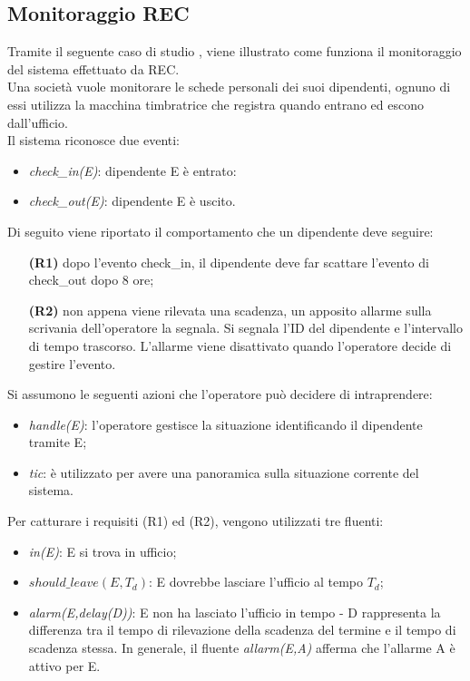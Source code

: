 \documentclass[a4paper,12pt]{report}
\begin{document}
\subsection{Monitoraggio REC}
Tramite il seguente caso di studio \cite{rif4}, viene illustrato come funziona il monitoraggio del sistema effettuato da REC.\\
Una società vuole monitorare le schede personali dei suoi dipendenti, ognuno di essi utilizza la macchina timbratrice che registra quando entrano ed escono dall'ufficio.\\
Il sistema riconosce due eventi:
\begin{itemize}
 \item \textit{check\_in(E)}: dipendente E è entrato:
 \item \textit{check\_out(E)}: dipendente E è uscito.
\end{itemize}
Di seguito viene riportato il comportamento che un dipendente deve seguire:
\begin{itemize}
 \item[\textbf{(R1)}] dopo l'evento check\_in, il dipendente deve far scattare l'evento di check\_out dopo 8 ore;
 \item[\textbf{(R2)}] non appena viene rilevata una scadenza, un apposito allarme sulla scrivania dell'operatore la segnala. Si segnala l'ID del dipendente e l'intervallo di tempo trascorso. L'allarme viene disattivato quando l'operatore decide di gestire l'evento.
\end{itemize}
Si assumono le seguenti azioni che l'operatore può decidere di intraprendere:
\begin{itemize}
 \item \textit{handle(E)}: l'operatore gestisce la situazione identificando il dipendente tramite E;
 \item \textit{tic}: è utilizzato per avere una panoramica sulla situazione corrente del sistema.
\end{itemize}
Per catturare i requisiti (R1) ed (R2), vengono utilizzati tre fluenti:
\begin{itemize}
 \item \textit{in(E)}: E si trova in ufficio;
 \item \textit{$should\_leave(E,T_d)$}: E dovrebbe lasciare l'ufficio al tempo $T_d$;
 \item \textit{alarm(E,delay(D))}: E non ha lasciato l'ufficio in tempo - D rappresenta la differenza tra il tempo di rilevazione della scadenza del termine e il tempo di scadenza stessa. In generale, il fluente \textit{allarm(E,A)} afferma che l'allarme A è attivo per E.
\end{itemize}
\end{document}
